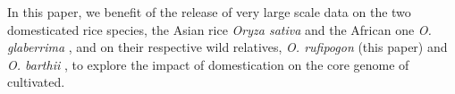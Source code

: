 \documentclass[10pt,letterpaper]{article}
\begin{document}
In this paper, we benefit of the release of very large scale data on the two domesticated rice species, the Asian rice \textit{Oryza sativa} \cite{3krgp} and the African one \textit{O. glaberrima} \cite{Cubry2018}, and on their respective wild relatives, \textit{O. rufipogon} (this paper) and \textit{O. barthii} \cite{Cubry2018}, to explore the impact of domestication on the core genome of cultivated.
% 
% 
% 
\end{document}
